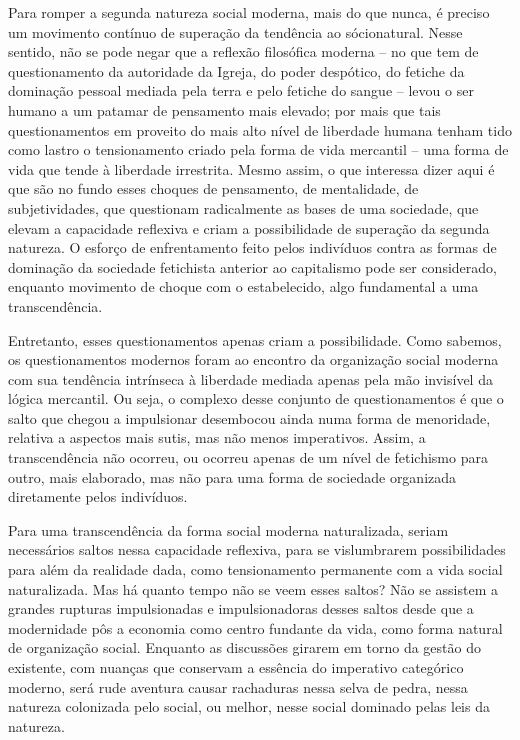 Para romper a segunda natureza social moderna, mais do que nunca, é
preciso um movimento contínuo de superação da tendência ao sócionatural.
Nesse sentido, não se pode negar que a reflexão filosófica moderna -- no
que tem de questionamento da autoridade da Igreja, do poder despótico,
do fetiche da dominação pessoal mediada pela terra e pelo fetiche do
sangue -- levou o ser humano a um patamar de pensamento mais elevado;
por mais que tais questionamentos em proveito do mais alto nível de
liberdade humana tenham tido como lastro o tensionamento criado pela
forma de vida mercantil -- uma forma de vida que tende à liberdade
irrestrita. Mesmo assim, o que interessa dizer aqui é que são no fundo
esses choques de pensamento, de mentalidade, de subjetividades, que
questionam radicalmente as bases de uma sociedade, que elevam a
capacidade reflexiva e criam a possibilidade de superação da segunda
natureza. O esforço de enfrentamento feito pelos indivíduos contra as
formas de dominação da sociedade fetichista anterior ao capitalismo pode
ser considerado, enquanto movimento de choque com o estabelecido, algo
fundamental a uma transcendência.

Entretanto, esses questionamentos apenas criam a possibilidade. Como
sabemos, os questionamentos modernos foram ao encontro da organização
social moderna com sua tendência intrínseca à liberdade mediada apenas
pela mão invisível da lógica mercantil. Ou seja, o complexo desse
conjunto de questionamentos é que o salto que chegou a impulsionar
desembocou ainda numa forma de menoridade, relativa a aspectos mais
sutis, mas não menos imperativos. Assim, a transcendência não ocorreu,
ou ocorreu apenas de um nível de fetichismo para outro, mais elaborado,
mas não para uma forma de sociedade organizada diretamente pelos
indivíduos.

Para uma transcendência da forma social moderna naturalizada, seriam
necessários saltos nessa capacidade reflexiva, para se vislumbrarem
possibilidades para além da realidade dada, como tensionamento
permanente com a vida social naturalizada. Mas há quanto tempo não se
veem esses saltos? Não se assistem a grandes rupturas impulsionadas e
impulsionadoras desses saltos desde que a modernidade pôs a economia
como centro fundante da vida, como forma natural de organização social.
Enquanto as discussões girarem em torno da gestão do existente, com
nuanças que conservam a essência do imperativo categórico moderno, será
rude aventura causar rachaduras nessa selva de pedra, nessa natureza
colonizada pelo social, ou melhor, nesse social dominado pelas leis da
natureza.

